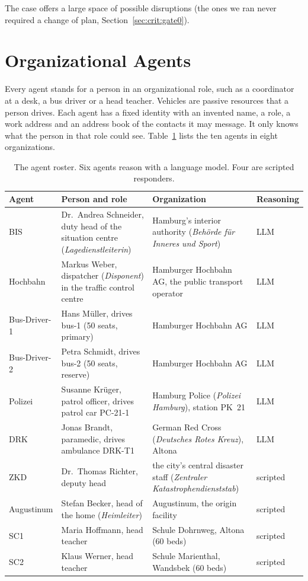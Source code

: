 The case offers a large space of possible disruptions (the ones we ran never
required a change of plan, Section~\ref{sec:crit:gate0}).

\section{Organizational Agents}
\label{sec:cs:agents}

Every agent stands for a person in an organizational role, such as a
coordinator at a desk, a bus driver or a head teacher. Vehicles are passive
resources that a person drives. Each agent has a fixed identity with an invented
name, a role, a work address and an address book of the contacts it may
message. It only knows what the person in that role could see.
Table~\ref{tab:cs:roster} lists the ten agents in eight organizations.

\begin{table}[htbp]
\centering
\caption{The agent roster. Six agents reason with a language model. Four are
scripted responders.}
\label{tab:cs:roster}
\small
\begin{tabularx}{\textwidth}{l>{\raggedright\arraybackslash}X>{\raggedright\arraybackslash}Xl}
\toprule
Agent & Person and role & Organization & Reasoning \\
\midrule
BIS & Dr.\ Andrea Schneider, duty head of the situation centre (\emph{Lagedienstleiterin}) & Hamburg's interior authority (\emph{Behörde für Inneres und Sport}) & LLM \\
Hochbahn & Markus Weber, dispatcher (\emph{Disponent}) in the traffic control centre & Hamburger Hochbahn AG, the public transport operator & LLM \\
Bus-Driver-1 & Hans Müller, drives bus-1 (50 seats, primary) & Hamburger Hochbahn AG & LLM \\
Bus-Driver-2 & Petra Schmidt, drives bus-2 (50 seats, reserve) & Hamburger Hochbahn AG & LLM \\
Polizei & Susanne Krüger, patrol officer, drives patrol car PC-21-1 & Hamburg Police (\emph{Polizei Hamburg}), station PK~21 & LLM \\
DRK & Jonas Brandt, paramedic, drives ambulance DRK-T1 & German Red Cross (\emph{Deutsches Rotes Kreuz}), Altona & LLM \\
ZKD & Dr.\ Thomas Richter, deputy head & the city's central disaster staff (\emph{Zentraler Katastrophendienststab}) & scripted \\
Augustinum & Stefan Becker, head of the home (\emph{Heimleiter}) & Augustinum, the origin facility & scripted \\
SC1 & Maria Hoffmann, head teacher & Schule Dohrnweg, Altona (60 beds) & scripted \\
SC2 & Klaus Werner, head teacher & Schule Marienthal, Wandsbek (60 beds) & scripted \\
\bottomrule
\end{tabularx}
\end{table}


